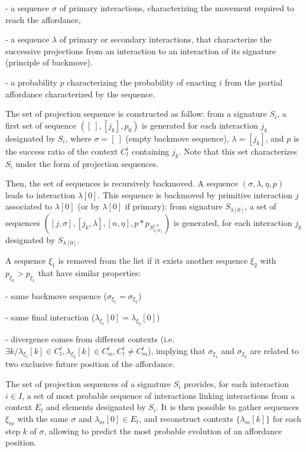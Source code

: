 \documentclass[conference]{IEEEtran}
\begin{document}
- a sequence $\sigma$ of primary interactions, characterizing the movement required to reach the affordance,

- a sequence $\lambda$ of primary or secondary interactions, that characterize the successive projections from an interaction to an interaction of its signature (principle of backmove).


- a probability $p$ characterizing the probability of enacting $i$ from the partial affordance characterized by the sequence.


The set of projection sequence is constructed as follow: from a signature $S_i$, a first set of sequence $([\:], [j_k], p_0)$ is generated for each interaction $j_k$ designated by $S_i$, where $\sigma=[\: ]$ (empty backmove sequence), $\lambda=[j_k]$,%
and $p$ is the success ratio of the context $C_l^i$ containing $j_k$. Note that this set characterizes $S_i$ under the form of projection sequences.

Then, the set of sequences is recursively backmoved. A sequence $(\sigma, \lambda, \eta, p)$ leads to interaction $\lambda[0]$. This sequence is backmoved by primitive interaction $j$ associated to $\lambda[0]$ (or by $\lambda[0]$ if primary): from signature $S_{\lambda[0]}$, a set of sequences $([j,\sigma], [j_k,\lambda], [n,\eta], p*p_{S_{\lambda[0]}^{j,n}})$ is generated, for each interaction $j_k$ designated by $S_{\lambda[0]}$.

A sequence $\xi_1$ is removed from the list if it exists another sequence $\xi_2$ with $p_{\xi_2}>p_{\xi_1}$ that have similar properties:

- same backmove sequence ($\sigma_{\xi_1}=\sigma_{\xi_2}$)

- same final interaction ($\lambda_{\xi_1}[0]=\lambda_{\xi_2}[0]$)

- divergence comes from different contexts (i.e. $\exists k / \lambda_{\xi_1}[k] \in C_l^i, \lambda_{\xi_2}[k] \in C_m^i, C_l^i \neq C_m^i$), implying that $\sigma_{\xi_1}$ and $\sigma_{\xi_2}$  are related to two exclusive future position of the affordance. %

The set of projection sequences of a signature $S_i$ provides, for each interaction $i \in I$, a set of most probable sequence of interactions linking interactions from a context $E_t$ and elements designated by $S_i$.
It is then possible to gather sequences $\xi_m$ with the same $\sigma$ and $\lambda_m[0]\in E_t$, and reconstruct contexts $\{\lambda_m[k]\}$ for each step $k$ of $\sigma$, allowing to predict the most probable evolution of an affordance position.
\end{document}
